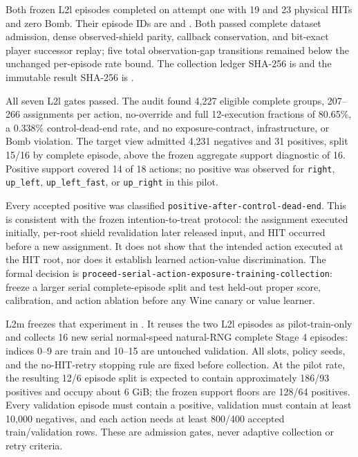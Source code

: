 \documentclass[11pt]{article}
\begin{document}
Both frozen L2l episodes completed on attempt one with 19 and 23 physical HITs
and zero Bomb.  Their episode IDs are
 and
.  Both passed complete dataset admission,
dense observed-shield parity, callback conservation, and bit-exact player
successor replay; five total observation-gap transitions remained below the
unchanged per-episode rate bound.  The collection ledger SHA-256 is
and the immutable result SHA-256 is
.

All seven L2l gates passed.  The audit found 4,227 eligible complete groups,
207--266 assignments per action, no-override and full 12-execution fractions
of 80.65\%, a 0.338\% control-dead-end rate, and no exposure-contract,
infrastructure, or Bomb violation.  The target view admitted 4,231 negatives
and 31 positives, split 15/16 by complete episode, above the frozen aggregate
support diagnostic of 16.  Positive support covered 14 of 18 actions; no
positive was observed for \texttt{right}, \texttt{up\_left},
\texttt{up\_left\_fast}, or \texttt{up\_right} in this pilot.

Every accepted positive was classified
\texttt{positive-after-control-dead-end}.  This is consistent with the frozen
intention-to-treat protocol: the assignment executed initially, per-root
shield revalidation later released input, and HIT occurred before a new
assignment.  It does not show that the intended action executed at the HIT
root, nor does it establish learned action-value discrimination.  The formal
decision is
\texttt{proceed-serial-action-exposure-training-collection}: freeze a larger
serial complete-episode split and test held-out proper score, calibration, and
action ablation before any Wine canary or value learner.

L2m freezes that experiment in
.  It reuses the two L2l
episodes as pilot-train-only and collects 16 new serial normal-speed natural-RNG
complete Stage 4 episodes: indices 0--9 are train and 10--15 are untouched
validation.  All slots, policy seeds, and the no-HIT-retry stopping rule are
fixed before collection.  At the pilot rate, the resulting 12/6 episode split
is expected to contain approximately 186/93 positives and occupy about 6 GiB;
the frozen support floors are 128/64 positives.  Every validation episode must
contain a positive, validation must contain at least 10,000 negatives, and each
action needs at least 800/400 accepted train/validation rows.  These are
admission gates, never adaptive collection or retry criteria.
\end{document}
